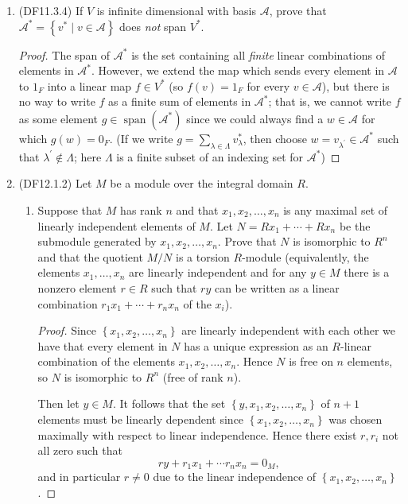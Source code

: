 \documentclass[11pt]{article}
\newcommand{\cbr}[1]{\left\{#1\right\}}
\DeclareMathOperator{\Span}{span}
\DeclareMathOperator{\End}{End}
\begin{document}
\begin{enumerate}
\begin{proof}
        Hence $\Phi$ is an $F$-algebra isomorphism from $\End(V)$ to $\End(V^\ast)$.
    \end{proof}
    \item (DF11.3.4) If $V$ is infinite dimensional with basis $\mathcal{A}$, prove that $\mathcal{A}^\ast = \cbr{v^\ast\mid v\in \mathcal{A}}$ does \textit{not} span $V^\ast$. \begin{proof}
        The span of $\mathcal{A}^\ast$ is the set containing all \textit{finite} linear combinations of elements in $\mathcal{A}^\ast$. However, we extend the map which sends every element in $\mathcal{A}$ to $1_F$ into a linear map $f\in V^\ast$ (so $f(v) = 1_F$ for every $v\in \mathcal{A}$), but there is no way to write $f$ as a finite sum of elements in $\mathcal{A}^\ast$; that is, we cannot write $f$ as some element $g\in \Span(\mathcal{A}^\ast)$ since we could always find a $w\in \mathcal{A}$ for which $g(w) = 0_F$. (If we write $g = \sum_{\lambda \in \Lambda}v^\ast_\lambda$, then choose $w = v_{\lambda^{\prime}}\in \mathcal{A}^\ast$ such that $\lambda^{\prime}\not\in \Lambda$; here $\Lambda$ is a finite subset of an indexing set for $\mathcal{A}^\ast$)
    \end{proof}
    \item (DF12.1.2) Let $M$ be a module over the integral domain $R$. \begin{enumerate}[label=\textbf{(\alph*)}]
        \item Suppose that $M$ has rank $n$ and that $x_1,x_2,\dots,x_n$ is any maximal set of linearly independent elements of $M$. Let $N = Rx_1 + \cdots + Rx_n$ be the submodule generated by $x_1,x_2,\dots,x_n$. Prove that $N$ is isomorphic to $R^n$ and that the quotient $M/N$ is a torsion $R$-module (equivalently, the elements $x_1,\dots,x_n$ are linearly independent and for any $y\in M$ there is a nonzero element $r\in R$ such that $ry$ can be written as a linear combination $r_1x_1 + \cdots + r_nx_n$ of the $x_i$). \begin{proof}
            Since $\cbr{x_1,x_2,\dots,x_n}$ are linearly independent with each other we have that every element in $N$ has a unique expression as an $R$-linear combination of the elements $x_1,x_2,\dots,x_n$. Hence $N$ is free on $n$ elements, so $N$ is isomorphic to $R^n$ (free of rank $n$).

            Then let $y\in M$. It follows that the set $\cbr{y,x_1,x_2,\dots,x_n}$ of $n+1$ elements must be linearly dependent since $\cbr{x_1,x_2,\dots,x_n}$ was chosen maximally with respect to linear independence. Hence there exist $r,r_i$ not all zero such that \[ry + r_1x_1 + \cdots r_nx_n = 0_M,\] and in particular $r\neq 0$ due to the linear independence of $\cbr{x_1,x_2,\dots,x_n}$.
            

\end{proof}
\end{enumerate}
\end{enumerate}
\end{document}
